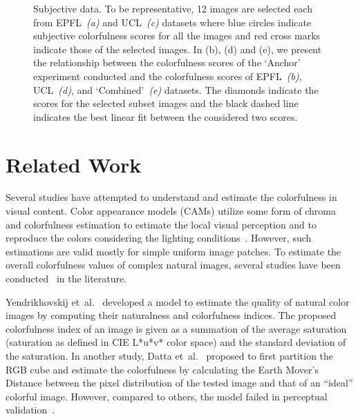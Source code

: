 \documentclass{article}
\begin{document}
 

\begin{figure*}[!htb]
    \centering
  \caption{Subjective data. To be representative, 12 images are selected each from EPFL~\textit{(a)} and UCL~\textit{(c)} datasets where blue circles indicate subjective colorfulness scores for all the images and red cross marks indicate those of the selected images. In (b), (d) and (e), we present the relationship between the colorfulness scores of the `Anchor' experiment conducted and the colorfulness scores of EPFL~\textit{(b)}, UCL~\textit{(d)}, and `Combined'~\textit{(e)} datasets. The diamonds indicate the scores for the selected subset images and the black dashed line indicates the best linear fit between the considered two scores.}
  \label{fig:subjScores}
  \vspace{-4pt}
\end{figure*}

\section{Related Work}
\label{sec:relatedWork}

Several studies have attempted to understand and estimate the colorfulness in visual content. Color appearance models (CAMs) utilize some form of chroma and colorfulness estimation to estimate the local visual perception and to reproduce the colors considering the lighting conditions~\cite{nayatani1995revision, hunt1995reproduction, fairchild2013color}. However, such estimations are valid mostly for simple uniform image patches. To estimate the overall colorfulness values of complex natural images, several studies have been conducted~\cite{yendrikhovskij1998optimizing, hasler2003measuring, datta2006studying, amati2014study, panetta2013no} in the literature. 








Yendrikhovskij et~al.~\cite{yendrikhovskij1998optimizing} developed a model to estimate the quality of natural color images by computing their naturalness and colorfulness indices. The proposed colorfulness index of an image is given as a summation of the average saturation (saturation as defined in CIE L*u*v* color space) and the standard deviation of the saturation. In another study, Datta et~al.~\cite{datta2006studying} proposed to first partition the RGB cube and estimate the colorfulness by calculating the Earth Mover's Distance between the pixel distribution of the tested image and that of an ``ideal'' colorful image. However, compared to others, the model failed in perceptual validation~\cite{amati2014study}.
\end{document}
